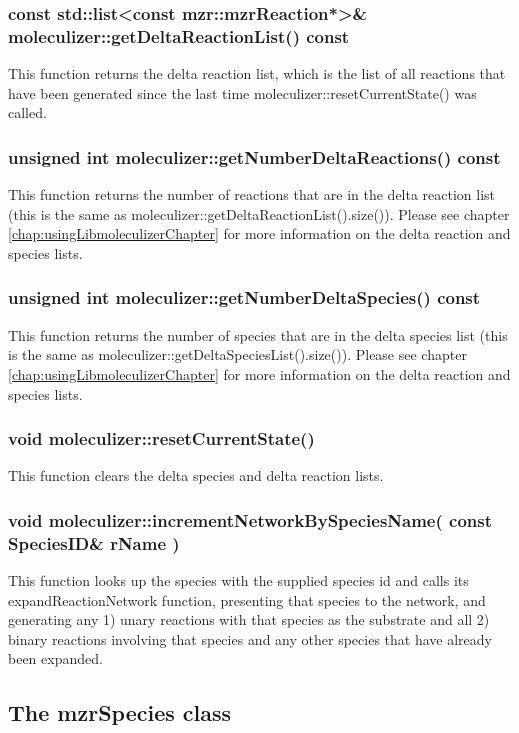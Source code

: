 \subsubsection{const std::list<const mzr::mzrReaction*>\&
  moleculizer::getDeltaReactionList() const}
This function returns the delta reaction list, which is the list of all
reactions that have been generated since the last time
moleculizer::resetCurrentState() was called.  

\subsubsection{unsigned int moleculizer::getNumberDeltaReactions()
  const}
This function returns the number of reactions that are in the delta
reaction list (this is the same as
moleculizer::getDeltaReactionList().size()).  Please see chapter
\ref{chap:usingLibmoleculizerChapter} for more information on the
delta reaction and species lists.  

\subsubsection{unsigned int moleculizer::getNumberDeltaSpecies()
  const}
This function returns the number of species that are in the delta
species list (this is the same as
moleculizer::getDeltaSpeciesList().size()).  Please see chapter
\ref{chap:usingLibmoleculizerChapter} for more information on the
delta reaction and species lists.  

\subsubsection{void moleculizer::resetCurrentState()}
This function clears the delta species and delta reaction lists.  

\subsubsection{void moleculizer::incrementNetworkBySpeciesName( const
  SpeciesID\& rName )}
This function looks up the species with the supplied species id and
calls its expandReactionNetwork function, presenting that species to
the network, and generating any 1) unary reactions with that species
as the substrate and all 2) binary reactions involving that species
and any other species that have already been expanded.

\subsection{The mzrSpecies class}

